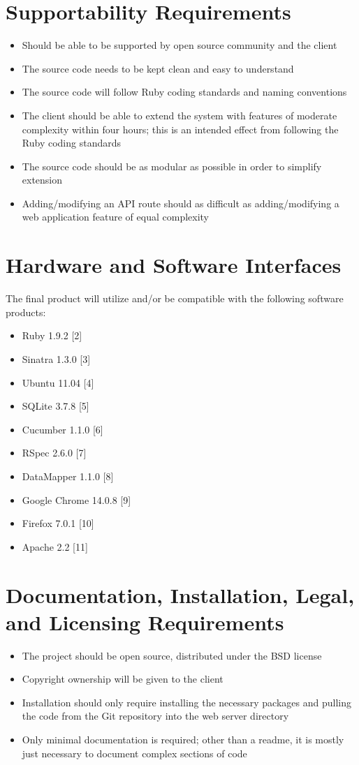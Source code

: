 \documentclass{article}
\begin{document}
\section{Supportability Requirements}
\begin{itemize}
\item Should be able to be supported by open source community and the client
\item The source code needs to be kept clean and easy to understand
\item The source code will follow Ruby coding standards and naming conventions
\item The client should be able to extend the system with features of moderate complexity within four hours; this is an intended effect from following the Ruby coding standards
\item The source code should be as modular as possible in order to simplify extension
\item Adding/modifying an API route should as difficult as adding/modifying a web application feature of equal complexity
\end{itemize}

\section{Hardware and Software Interfaces}
The final product will utilize and/or be compatible with the following software products:\\
\begin{itemize}
\item Ruby 1.9.2 [2]
\item Sinatra 1.3.0 [3]
\item Ubuntu 11.04 [4]
\item SQLite 3.7.8 [5]
\item Cucumber 1.1.0 [6]
\item RSpec 2.6.0 [7]
\item DataMapper 1.1.0 [8]
\item Google Chrome 14.0.8 [9]
\item Firefox 7.0.1 [10]
\item Apache 2.2 [11]
\end{itemize}

\section{Documentation, Installation, Legal, and Licensing Requirements}
\begin{itemize}
\item The project should be open source, distributed under the BSD license
\item Copyright ownership will be given to the client
\item Installation should only require installing the necessary packages and pulling the code from the Git repository into the web server directory
\item Only minimal documentation is required; other than a readme, it is mostly just necessary to document complex sections of code
\end{itemize}
\end{document}
